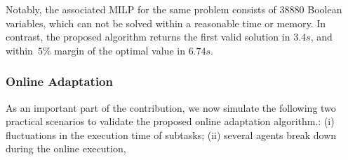 Notably, the associated MILP for the same problem consists of $38880$ Boolean variables,
which can not be solved within a reasonable time or memory.
In contrast, the proposed algorithm returns the first valid solution in $3.4s$,
and within~$5\%$ margin of the optimal value in $6.74s$.


\subsubsection{Online Adaptation}\label{subsubsec:exp-adapt}
As an important part of the contribution, we now simulate
the following two practical scenarios to validate the proposed online adaptation algorithm.:
(i) fluctuations in the execution time of subtasks;
(ii) several agents break down during the online execution,

